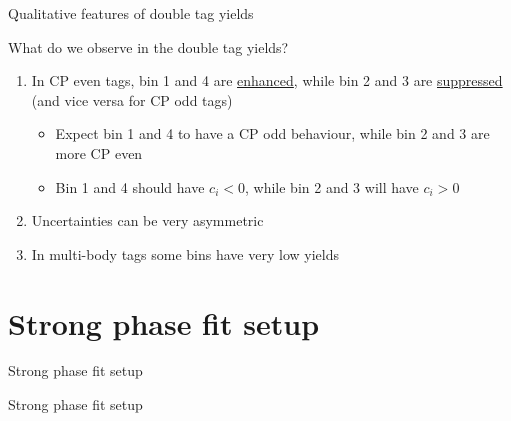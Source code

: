 \documentclass{beamer}
\begin{document}
\begin{frame}{Qualitative features of double tag yields}
  \begin{center}
    \Large{What do we observe in the double tag yields?}
  \end{center}
  \vspace{0.5cm}
  \begin{enumerate}
    \setlength\itemsep{1.0em}
    \item{In CP even tags, bin 1 and 4 are \underline{enhanced}, while bin 2 and 3 are \underline{suppressed} (and vice versa for CP odd tags)}
    \begin{itemize}
      \setlength\itemsep{0.5em}
      \item{Expect bin 1 and 4 to have a CP odd behaviour, while bin 2 and 3 are more CP even}
      \item{Bin 1 and 4 should have $c_i < 0$, while bin 2 and 3 will have $c_i > 0$}
    \end{itemize}
    \item{Uncertainties can be very asymmetric}
    \item{In multi-body tags some bins have very low yields}
  \end{enumerate}
\end{frame}

\section{Strong phase fit setup}
\begin{frame}{Strong phase fit setup}
  \begin{center}
    {\huge Strong phase fit setup}
  \end{center}
\end{frame}
\end{document}
